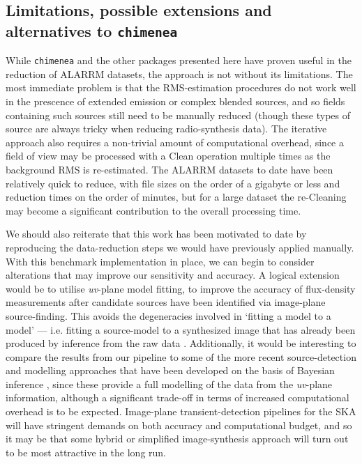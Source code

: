 \documentclass[5p,authoryear]{elsarticle}
\begin{document}
\subsection{Limitations, possible extensions and alternatives to \texttt{chimenea}}
\label{sec:chimenea-discussion}
While \texttt{chimenea} and the other packages presented here have proven useful in the reduction of ALARRM datasets, the approach is not without its limitations.
The most immediate problem is that the RMS-estimation procedures do not work well in the prescence of extended emission or complex blended sources, and so fields containing such sources still need to be manually reduced (though these types of source are always tricky when reducing radio-synthesis data). 
The iterative approach also requires a non-trivial amount of computational overhead, since a field of view may be processed with a Clean operation multiple times as the background RMS is re-estimated. 
The ALARRM datasets to date have been relatively quick to reduce, with file sizes on the order of a gigabyte or less and reduction times on the order of minutes, but for a large dataset the re-Cleaning may become a significant contribution to the overall processing time. 

We should also reiterate that this work has been motivated to date by reproducing the data-reduction steps we would have previously applied manually. 
With this benchmark implementation in place, we can begin to consider alterations that may improve our sensitivity and accuracy. 
A logical extension would be to utilise \textit{uv}-plane model fitting, to improve the accuracy of flux-density measurements after candidate sources have been identified via image-plane source-finding. 
This avoids the degeneracies involved in `fitting a model to a model' --- i.e. fitting a source-model to a synthesized image that has already been produced by inference from the raw data  \citep{MartiVidal2014}.
Additionally, it would be interesting to compare the results from our pipeline to some of the more recent source-detection and modelling approaches that have been developed on the basis of Bayesian inference \citep[e.g.][]{Sutter2014,Lochner2015}, since these provide a full modelling of the data from the \textit{uv}-plane information, although a significant trade-off in terms of increased computational overhead is to be expected. 
Image-plane transient-detection pipelines for the SKA will have stringent demands on both accuracy and computational budget, and so it may be that some hybrid or simplified image-synthesis approach will turn out to be most attractive in the long run.
\end{document}
